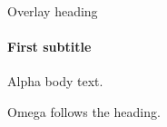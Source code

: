 \documentclass[11pt,aspectratio=169]{beamer}
\date{}
\begin{document}
\begin{frame}[t]{Overlay heading}
\framesubtitle{First  subtitle}
Alpha body text.

Omega follows the heading.
\end{frame}
\end{document}
